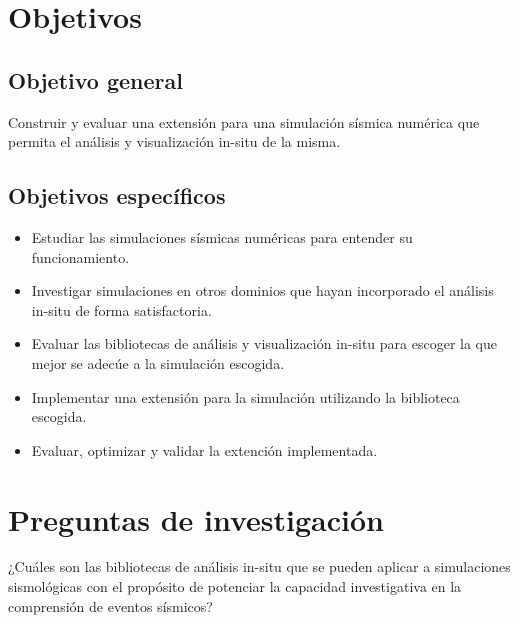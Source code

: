 \documentclass{article}
\begin{document}
\section{Objetivos}
\subsection{Objetivo general}
Construir y evaluar una extensión para una simulación sísmica numérica que permita el análisis y visualización in-situ de la misma.
\subsection{Objetivos específicos}
\begin{itemize}
  \item Estudiar las simulaciones sísmicas numéricas para entender su funcionamiento.
  \item Investigar simulaciones en otros dominios que hayan incorporado el análisis in-situ de forma satisfactoria.
  \item Evaluar las bibliotecas de análisis y visualización in-situ para escoger la que mejor se adecúe a la simulación escogida.
  \item Implementar una extensión para la simulación utilizando la biblioteca escogida.
  \item Evaluar, optimizar y validar la extención implementada.
\end{itemize}

\section{Preguntas de investigación}
¿Cuáles son las bibliotecas de análisis in-situ que se pueden aplicar a simulaciones sismológicas con el propósito de potenciar la capacidad investigativa en la comprensión de eventos sísmicos?

\printbibliography
\end{document}
